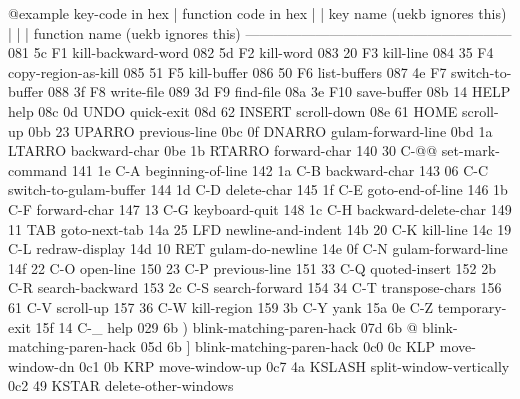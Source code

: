 {{@example
key-code in hex
|       function code in hex
|       |       key name (uekb ignores this)
|       |       |              function name  (uekb ignores this)
---------------------------------------------------------
081     5c      F1              kill-backward-word
082     5d      F2              kill-word
083     20      F3              kill-line
084     35      F4              copy-region-as-kill
085     51      F5              kill-buffer
086     50      F6              list-buffers
087     4e      F7              switch-to-buffer
088     3f      F8              write-file
089     3d      F9              find-file
08a     3e      F10             save-buffer
08b     14      HELP            help
08c     0d      UNDO            quick-exit
08d     62      INSERT          scroll-down
08e     61      HOME            scroll-up
0bb     23      UPARRO          previous-line
0bc     0f      DNARRO          gulam-forward-line
0bd     1a      LTARRO          backward-char
0be     1b      RTARRO          forward-char
140     30      C-@@            set-mark-command
141     1e      C-A             beginning-of-line
142     1a      C-B             backward-char
143     06      C-C             switch-to-gulam-buffer
144     1d      C-D             delete-char
145     1f      C-E             goto-end-of-line
146     1b      C-F             forward-char
147     13      C-G             keyboard-quit
148     1c      C-H             backward-delete-char
149     11      TAB             goto-next-tab
14a     25      LFD             newline-and-indent
14b     20      C-K             kill-line
14c     19      C-L             redraw-display
14d     10      RET             gulam-do-newline
14e     0f      C-N             gulam-forward-line
14f     22      C-O             open-line
150     23      C-P             previous-line
151     33      C-Q             quoted-insert
152     2b      C-R             search-backward
153     2c      C-S             search-forward
154     34      C-T             transpose-chars
156     61      C-V             scroll-up
157     36      C-W             kill-region
159     3b      C-Y             yank
15a     0e      C-Z             temporary-exit
15f     14      C-_             help
029     6b      )               blink-matching-paren-hack
07d     6b      @}              blink-matching-paren-hack
05d     6b      ]               blink-matching-paren-hack
0c0     0c      KLP             move-window-dn
0c1     0b      KRP             move-window-up
0c7     4a      KSLASH          split-window-vertically
0c2     49      KSTAR           delete-other-windows
}
